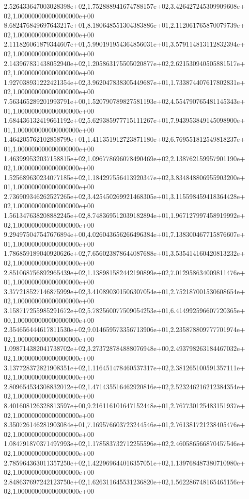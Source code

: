 2.526433647003028398e+02,1.752888941674788157e+02,3.426427245309909608e+02,1.000000000000000000e+00
8.682476849697643217e+01,8.180648551304383886e+01,2.112061765870079739e+02,1.000000000000000000e+00
2.111826061879344607e+01,5.990191954364856031e+01,3.579114813112832394e+02,1.000000000000000000e+00
2.143967831438052940e+02,1.205863175505020877e+02,2.621530940505881517e+02,1.000000000000000000e+00
1.927038931222421354e+02,3.962047838305449687e+01,1.733874407617802831e+02,1.000000000000000000e+00
7.563465289201993791e+00,1.520790789827581193e+02,4.554790765481145343e+01,1.000000000000000000e+00
1.684436132419661192e+02,5.629385977715111267e+01,7.943953849145098900e+01,1.000000000000000000e+00
1.464205762102858799e+01,1.411351912723871180e+02,6.769551812549818237e+01,1.000000000000000000e+00
1.463999532037158815e+02,1.096778696078490469e+02,2.138762159957901190e+02,1.000000000000000000e+00
1.525689630234077185e+02,1.184297556413920347e+02,3.834848806955903200e+01,1.000000000000000000e+00
2.736909346262527265e+02,3.425450269921468305e+01,3.115598459418364428e+02,1.000000000000000000e+00
1.561347638208882245e+02,8.748369512039182894e+01,1.967127997458919992e+02,1.000000000000000000e+00
9.294975047547676894e+00,4.026043656266496384e+01,7.138300467715876607e+01,1.000000000000000000e+00
1.786859189040920626e+02,7.656023878644087688e+01,3.535414160420813232e+02,1.000000000000000000e+00
2.851068756892965439e+02,1.138981582442190899e+02,7.012958634009811476e+01,1.000000000000000000e+00
3.377218527146875999e+02,3.410890301506307054e+01,2.752187001530608654e+02,1.000000000000000000e+00
3.158717255985291672e+02,5.782560077509054253e+01,6.414992596607720365e+00,1.000000000000000000e+00
2.354656444617811530e+02,9.014659573356713906e+01,2.235878809777701974e+02,1.000000000000000000e+00
1.098714382041738702e+02,3.273728784888076948e+00,2.493798263184467032e+02,1.000000000000000000e+00
3.137728372821908351e+02,1.116451478460537317e+02,2.381265100591357111e+02,1.000000000000000000e+00
2.809654534308832012e+02,1.471435516462920816e+02,2.523246216212384354e+02,1.000000000000000000e+00
8.401608126328813597e+00,9.216116101647152448e+01,2.767730125483151937e+02,1.000000000000000000e+00
8.350726146281903084e+01,7.169576603723244546e+01,2.761381721238405476e+02,1.000000000000000000e+00
1.084791870371497993e+02,1.178583732712255596e+02,2.460586566870457546e+02,1.000000000000000000e+00
2.785964363011357250e+02,1.422969644016357051e+02,1.139768487380710980e+02,1.000000000000000000e+00
2.848637697242123750e+02,1.626311645531236820e+02,1.562286748165465156e+02,1.000000000000000000e+00
